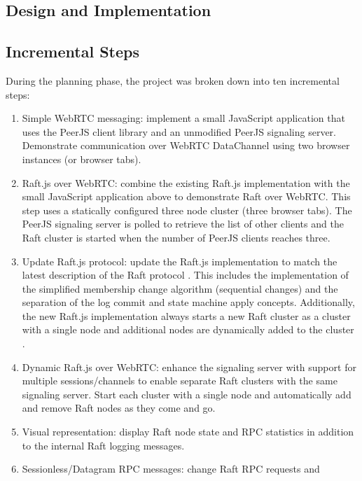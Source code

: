 \documentclass[9pt]{extarticle}
\begin{document}
\begin{multicols}{2}

\section {Design and Implementation}

\subsection{Incremental Steps}

During the planning phase, the project was broken down into ten incremental steps:

\begin{enumerate}
\item Simple WebRTC messaging: implement a small JavaScript
    application that uses the PeerJS client library and an unmodified
    PeerJS signaling server. Demonstrate communication over WebRTC
    DataChannel using two browser instances (or browser tabs).
\item Raft.js over WebRTC: combine the existing Raft.js implementation
    with the small JavaScript application above to demonstrate Raft
    over WebRTC. This step uses a statically configured three node
    cluster (three browser tabs). The PeerJS signaling server is
    polled to retrieve the list of other clients and the Raft cluster
    is started when the number of PeerJS clients reaches three.
\item Update Raft.js protocol: update the Raft.js implementation to
    match the latest description of the Raft protocol
    \cite{raft_thesis:ongaro14}. This includes the implementation of
    the simplified membership change algorithm (sequential changes)
    and the separation of the log commit and state machine apply
    concepts.  Additionally, the new Raft.js implementation always
    starts a new Raft cluster as a cluster with a single node and
    additional nodes are dynamically added to the cluster
    \cite[Section~4.4]{raft_thesis:ongaro14}.
\item Dynamic Raft.js over WebRTC: enhance the signaling server with
    support for multiple sessions/channels to enable separate Raft
    clusters with the same signaling server. Start each cluster with
    a single node and automatically add and remove Raft nodes as they
    come and go.
\item Visual representation: display Raft node state and RPC
    statistics in addition to the internal Raft logging messages.
\item Sessionless/Datagram RPC messages: change Raft RPC requests and

\end{enumerate}
\end{multicols}
\end{document}
